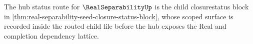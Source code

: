 The hub status route for $\RealSeparabilityUp$ is the child closurestatus block in \autoref{thm:real-separability-seed-closure-status-block}, whose scoped surface is recorded inside the routed child file before the hub exposes the Real and completion dependency lattice.
